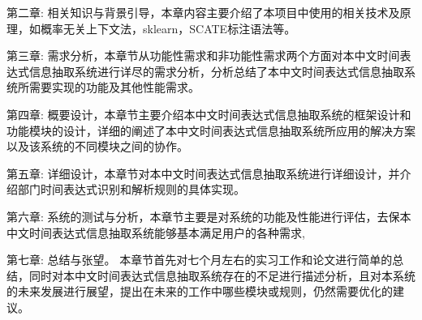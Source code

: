 第二章: 相关知识与背景引导，本章内容主要介绍了本项目中使用的相关技术及原理，如概率无关上下文法，sklearn，SCATE标注语法等。

第三章: 需求分析，本章节从功能性需求和非功能性需求两个方面对本中文时间表达式信息抽取系统进行详尽的需求分析，分析总结了本中文时间表达式信息抽取系统所需要实现的功能及其他性能需求。

第四章: 概要设计，本章节主要介绍本中文时间表达式信息抽取系统的框架设计和功能模块的设计，详细的阐述了本中文时间表达式信息抽取系统所应用的解决方案以及该系统的不同模块之间的协作。

第五章: 详细设计，本章节对本中文时间表达式信息抽取系统进行详细设计，并介绍部门时间表达式识别和解析规则的具体实现。

第六章: 系统的测试与分析，本章节主要是对系统的功能及性能进行评估，去保本中文时间表达式信息抽取系统能够基本满足用户的各种需求,

第七章: 总结与张望。 本章节首先对七个月左右的实习工作和论文进行简单的总结，同时对本中文时间表达式信息抽取系统存在的不足进行描述分析，且对本系统的未来发展进行展望，提出在未来的工作中哪些模块或规则，仍然需要优化的建议。



